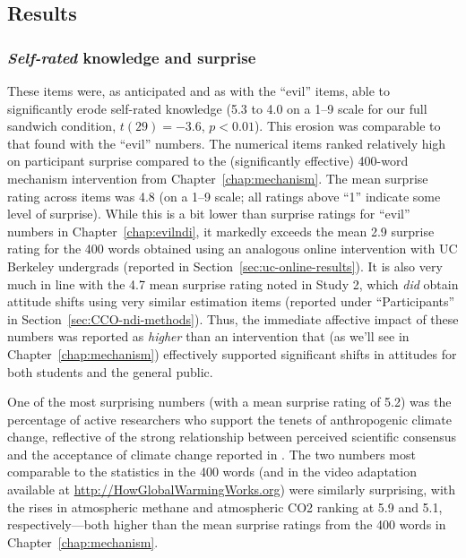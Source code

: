 % 

\subsection{Results}

\subsubsection{\emph{Self-rated} knowledge and surprise}

These items were, as anticipated and as with the “evil” items, able to
significantly erode self-rated knowledge (5.3 to 4.0 on a 1--9 scale for our full sandwich
condition, $t(29)=-3.6$, $p<0.01$).  This erosion was comparable to that found
with the “evil” numbers.  The numerical items ranked relatively high on
participant surprise compared to the (significantly effective) 400-word
mechanism intervention from Chapter~\ref{chap:mechanism}.  The mean surprise
rating across items was 4.8 (on a 1--9 scale; all ratings above “1” indicate
some level of surprise).  While this is a bit lower than surprise ratings for
“evil” numbers in Chapter~\ref{chap:evilndi}, it markedly exceeds the mean 2.9
surprise rating for the 400 words obtained using an analogous online
intervention with UC Berkeley undergrads (reported in
Section~\ref{sec:uc-online-results}). It is also very much in line with the 4.7
mean surprise rating noted in Study 2, which \emph{did} obtain attitude shifts
using very similar estimation items (reported under “Participants” in
Section~\ref{sec:CCO-ndi-methods}). Thus, the immediate affective impact of
these numbers was reported as \emph{higher} than an intervention that (as we'll
see in Chapter~\ref{chap:mechanism}) effectively supported significant shifts in
attitudes for both students and the general public.

One of the most surprising numbers (with a mean surprise rating of 5.2) was the percentage of active
researchers who support the tenets of anthropogenic climate change, reflective
of the strong relationship between perceived scientific consensus and the acceptance
of climate change reported in \textcite{lewandowsky_pivotal_2013}. The two
numbers most comparable to the statistics in the 400 words (and in the video
adaptation available at \url{http://HowGlobalWarmingWorks.org}) were similarly
surprising, with the rises in atmospheric methane and atmospheric CO2 ranking at
5.9 and 5.1, respectively---both higher than the mean surprise ratings from the
400 words in Chapter~\ref{chap:mechanism}.


